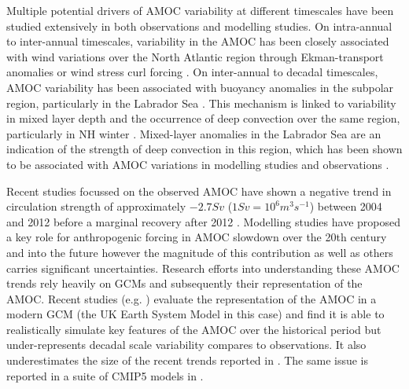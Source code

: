 Multiple potential drivers of AMOC variability at different timescales have been studied extensively in both observations and modelling studies. On intra-annual to inter-annual timescales, variability in the AMOC has been closely associated with wind variations over the North Atlantic region through Ekman-transport anomalies or wind stress curl forcing \citep{wangCharacteristic2019b, mccarthyObserved2012b, mielkeObserved2013b, yangLocal2015b}. On inter-annual to decadal timescales, AMOC variability has been associated with buoyancy anomalies in the subpolar region, particularly in the Labrador Sea \citep{delworthInterdecadal1993b, medhaugMechanisms2012b}. This mechanism is linked to variability in mixed layer depth and the occurrence of deep convection over the same region, particularly in NH winter \citep{boningDecadal2006c, biastochCauses2008c, robsonCauses2012c, wangVariability2015b}. Mixed-layer anomalies in the Labrador Sea are an indication of the strength of deep convection in this region, which has been shown to be associated with AMOC variations in modelling studies \citep{edenMechanism2001b, edenNorth2001b} and observations \citep{latifPerspective2011b}.

Recent studies focussed on the observed AMOC have shown a negative trend in circulation strength of approximately $-2.7 Sv$ ($1 Sv = 10^6 m^3 s^{-1}$) between 2004 and 2012 \citep{smeedNorth2018b} before a marginal recovery after 2012 \citep{smeedAtlantic2019c}. Modelling studies have proposed a key role for anthropogenic forcing in AMOC slowdown over the 20th century and into the future \citep{liuOverlooked2017a, bakkerFate2016b, liuMechanisms2019b} however the magnitude of this contribution as well as others carries significant uncertainties. Research efforts into understanding these AMOC trends rely heavily on GCMs and subsequently their representation of the AMOC. Recent studies (e.g. \cite{robsonEvaluation2020d}) evaluate the representation of the AMOC in a modern GCM (the UK Earth System Model in this case) and find it is able to realistically simulate key features of the AMOC over the historical period but under-represents decadal scale variability compares to observations. It also underestimates the size of the recent trends reported in \cite{smeedNorth2018b, smeedAtlantic2019c}. The same issue is reported in a suite of CMIP5 models in \cite{roberts20042014}.

